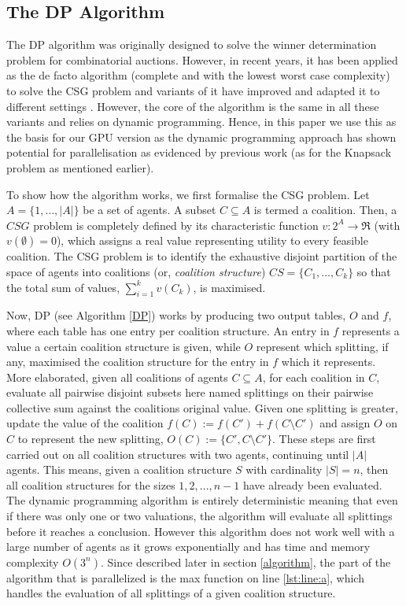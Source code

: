\documentclass{llncs}
\begin{document}
\subsection{The {DP} Algorithm} 
The DP algorithm \cite{DPalgorithm} was originally designed to solve the winner determination problem for combinatorial auctions. However, in recent years, it has been applied as the de facto  algorithm (complete and with the lowest worst case complexity) to solve the CSG problem and variants of it have improved and adapted it to different settings \cite{DBLP:conf/atal/RahwanJ08,DBLP:conf/aamas/VoiceRJ12}. However, the core of the algorithm is the same in all these variants and relies on dynamic programming. Hence, in this paper we use this as the basis for our GPU version as the dynamic programming approach has shown potential for parallelisation as evidenced by previous work (as for the Knapsack problem as mentioned earlier). 

To show how the algorithm works, we first formalise the CSG problem.  Let $A=\{1,\ldots,\vert A \vert \}$ be a set of agents. A subset $C \subseteq A$ is termed a coalition.  Then, a $CSG$ problem is completely defined by its characteristic function $v: 2^{A} \rightarrow \Re$ (with $v(\emptyset)=0$), which assigns a real value representing utility to every feasible coalition.  The CSG problem is to identify the exhaustive disjoint partition of the space of agents into coalitions (or, \emph{coalition structure})  $CS=\{C_1,\ldots,C_k\}$ so that the total sum of values, $\sum^k_{i=1} v(C_k)$,
is maximised.

Now, DP (see Algorithm  \ref{DP}) works by producing two output tables, $O$ and $f$, 
where each table has one entry per coalition structure. 
An entry in $f$ represents a value a certain coalition structure is given, 
while $O$ represent which splitting, if any, maximised the coalition structure for the entry in $f$ which it represents.
More elaborated, given all coalitions of agents $C\subseteq A$, for each coalition in $C$, evaluate all
pairwise disjoint subsets here named splittings on their pairwise collective sum against the coalitions
original value. Given one splitting is greater, update the value of the coalition $f(C) := f(C') + f(C\setminus C')$
and assign $O$ on $C$ to represent the new splitting, $O(C) := \{C',C\setminus C'\}$. These steps are first carried out on all coalition structures with two agents, continuing until $|A|$ agents.  This means, given a coalition structure $S$ with cardinality $|S| = n$, then all coalition structures
for the sizes $1,2,...,n-1$ have already been evaluated. The dynamic programming algorithm is entirely deterministic meaning that even if there was only one or two valuations, the algorithm will evaluate all splittings before it reaches a conclusion. However this algorithm does not work well with a large number of agents as it grows exponentially and has time and memory complexity $O(3^n)$. Since described later in section \ref{algorithm}, the part of the algorithm that is parallelized is the max function on line \ref{lst:line:a}, which handles the evaluation of all splittings of a given coalition structure.
\end{document}
